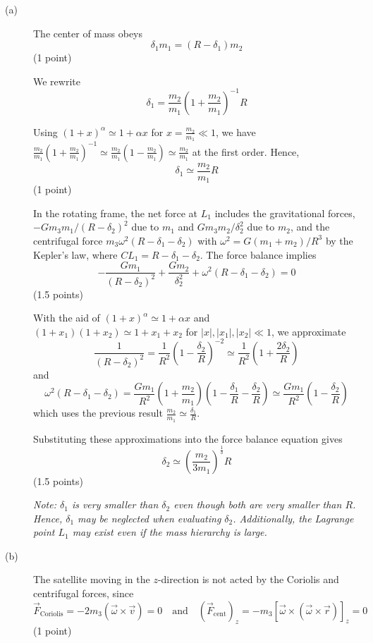 \begin{description}
\item[(a)] The center of mass obeys
  \[ \delta_1 m_1 = (R - \delta_1)m_2 \]
  \hfill(1 point)

  We rewrite
  \[ \delta_1 = \frac{m_2}{m_1}\left(1 + \frac{m_2}{m_1}\right)^{-1} R \]

  Using $(1+x)^\alpha \simeq 1 + \alpha x$ for $x = \frac{m_2}{m_1} \ll 1$,
  we have
  $\frac{m_2}{m_1}\left(1 + \frac{m_2}{m_1}\right)^{-1}
   \simeq \frac{m_2}{m_1}\left(1 - \frac{m_2}{m_1}\right)
   \simeq \frac{m_2}{m_1}$ at the first order. Hence,
  \[ \delta_1 \simeq \frac{m_2}{m_1} R \]
  \hfill(1 point)

  In the rotating frame, the net force at $L_1$ includes the gravitational
  forces, $-Gm_3m_1/(R - \delta_2)^2$ due to $m_1$ and $Gm_3m_2/\delta_2^2$
  due to $m_2$, and the centrifugal force
  $m_3\omega^2(R - \delta_1 - \delta_2)$ with
  $\omega^2 = G(m_1 + m_2)/R^3$ by the Kepler's law, where
  $CL_1 = R - \delta_1 - \delta_2$. The force balance implies
  \[ -\frac{Gm_1}{(R - \delta_2)^2} + \frac{Gm_2}{\delta_2^2}
     + \omega^2(R - \delta_1 - \delta_2) = 0 \]
  \hfill(1.5 points)

  With the aid of $(1+x)^\alpha \simeq 1 + \alpha x$ and
  $(1 + x_1)(1 + x_2) \simeq 1 + x_1 + x_2$ for
  $|x|, |x_1|, |x_2| \ll 1$, we approximate
  \[ \frac{1}{(R - \delta_2)^2}
     = \frac{1}{R^2}\left(1 - \frac{\delta_2}{R}\right)^{-2}
     \simeq \frac{1}{R^2}\left(1 + \frac{2\delta_2}{R}\right) \]
  and
  \[ \omega^2(R - \delta_1 - \delta_2)
     = \frac{Gm_1}{R^2}\left(1 + \frac{m_2}{m_1}\right)
       \left(1 - \frac{\delta_1}{R} - \frac{\delta_2}{R}\right)
     \simeq \frac{Gm_1}{R^2}\left(1 - \frac{\delta_2}{R}\right) \]
  which uses the previous result
  $\frac{m_2}{m_1} \simeq \frac{\delta_1}{R}$.

  Substituting these approximations into the force balance equation gives
  \[ \delta_2 \simeq \left(\frac{m_2}{3m_1}\right)^{\frac{1}{3}} R \]
  \hfill(1.5 points)

  \emph{Note: $\delta_1$ is very smaller than $\delta_2$ even though both
  are very smaller than $R$. Hence, $\delta_1$ may be neglected when
  evaluating $\delta_2$. Additionally, the Lagrange point $L_1$ may exist
  even if the mass hierarchy is large.}

\item[(b)] The satellite moving in the $z$-direction is not acted by the
  Coriolis and centrifugal forces, since
  \[ \vec{F}_{\mathrm{Coriolis}} = -2m_3(\vec{\omega} \times \vec{v}) = 0
     \quad\text{and}\quad
     (\vec{F}_{\mathrm{cent}})_z
     = -m_3[\vec{\omega} \times (\vec{\omega} \times \vec{r})]_z = 0 \]
  \hfill(1 point)


\end{description}

